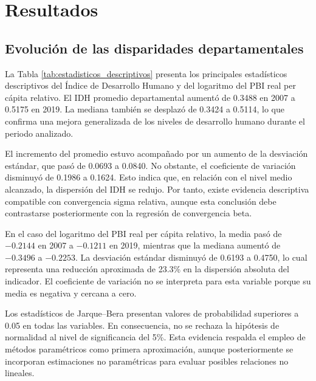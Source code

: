 \section{Resultados}

\subsection{Evolución de las disparidades departamentales}

La Tabla \ref{tab:estadisticos_descriptivos} presenta los principales
estadísticos descriptivos del Índice de Desarrollo Humano y del logaritmo del
PBI real per cápita relativo. El IDH promedio departamental aumentó de 0.3488
en 2007 a 0.5175 en 2019. La mediana también se desplazó de 0.3424 a 0.5114,
lo que confirma una mejora generalizada de los niveles de desarrollo humano
durante el periodo analizado.

El incremento del promedio estuvo acompañado por un aumento de la desviación
estándar, que pasó de 0.0693 a 0.0840. No obstante, el coeficiente de variación
disminuyó de 0.1986 a 0.1624. Esto indica que, en relación con el nivel medio
alcanzado, la dispersión del IDH se redujo. Por tanto, existe evidencia
descriptiva compatible con convergencia sigma relativa, aunque esta conclusión
debe contrastarse posteriormente con la regresión de convergencia beta.

En el caso del logaritmo del PBI real per cápita relativo, la media pasó de
$-0.2144$ en 2007 a $-0.1211$ en 2019, mientras que la mediana aumentó de
$-0.3496$ a $-0.2253$. La desviación estándar disminuyó de 0.6193 a 0.4750,
lo cual representa una reducción aproximada de 23.3\% en la dispersión
absoluta del indicador. El coeficiente de variación no se interpreta para esta
variable porque su media es negativa y cercana a cero.

Los estadísticos de Jarque--Bera presentan valores de probabilidad superiores
a 0.05 en todas las variables. En consecuencia, no se rechaza la hipótesis de
normalidad al nivel de significancia del 5\%. Esta evidencia respalda el empleo
de métodos paramétricos como primera aproximación, aunque posteriormente se
incorporan estimaciones no paramétricas para evaluar posibles relaciones no
lineales.

